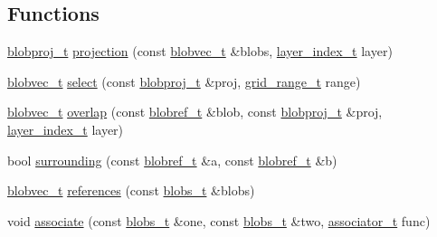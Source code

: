 \subsection*{Functions}
\begin{DoxyCompactItemize}
\item 
\hyperlink{namespace_wire_cell_1_1_ray_grid_a2495e73e12fdf4e81ffef9d99f8a8e22}{blobproj\+\_\+t} \hyperlink{namespace_wire_cell_1_1_ray_grid_ab1dc12b3013c5cc290ca5f8d945d54e5}{projection} (const \hyperlink{namespace_wire_cell_1_1_ray_grid_a3154c64db4d07056418dfcd1afbf0531}{blobvec\+\_\+t} \&blobs, \hyperlink{namespace_wire_cell_1_1_ray_grid_ab7562e54b58eede813d5b70b5eb85812}{layer\+\_\+index\+\_\+t} layer)
\item 
\hyperlink{namespace_wire_cell_1_1_ray_grid_a3154c64db4d07056418dfcd1afbf0531}{blobvec\+\_\+t} \hyperlink{namespace_wire_cell_1_1_ray_grid_ab4d35d6d20bc86bbc5403f8a50824ec6}{select} (const \hyperlink{namespace_wire_cell_1_1_ray_grid_a2495e73e12fdf4e81ffef9d99f8a8e22}{blobproj\+\_\+t} \&proj, \hyperlink{namespace_wire_cell_1_1_ray_grid_a4f0a195ceaa41bf0c9d13f0c81309633}{grid\+\_\+range\+\_\+t} range)
\item 
\hyperlink{namespace_wire_cell_1_1_ray_grid_a3154c64db4d07056418dfcd1afbf0531}{blobvec\+\_\+t} \hyperlink{namespace_wire_cell_1_1_ray_grid_af03e98b7efe2bb929cf7d581897eff83}{overlap} (const \hyperlink{namespace_wire_cell_1_1_ray_grid_abed76699c704f53d6c4ce912da18050b}{blobref\+\_\+t} \&blob, const \hyperlink{namespace_wire_cell_1_1_ray_grid_a2495e73e12fdf4e81ffef9d99f8a8e22}{blobproj\+\_\+t} \&proj, \hyperlink{namespace_wire_cell_1_1_ray_grid_ab7562e54b58eede813d5b70b5eb85812}{layer\+\_\+index\+\_\+t} layer)
\item 
bool \hyperlink{namespace_wire_cell_1_1_ray_grid_a3bad40376b17bd165849797eb16c9ed2}{surrounding} (const \hyperlink{namespace_wire_cell_1_1_ray_grid_abed76699c704f53d6c4ce912da18050b}{blobref\+\_\+t} \&a, const \hyperlink{namespace_wire_cell_1_1_ray_grid_abed76699c704f53d6c4ce912da18050b}{blobref\+\_\+t} \&b)
\item 
\hyperlink{namespace_wire_cell_1_1_ray_grid_a3154c64db4d07056418dfcd1afbf0531}{blobvec\+\_\+t} \hyperlink{namespace_wire_cell_1_1_ray_grid_a1f3f06c1120d6202ac80459d28c4afa4}{references} (const \hyperlink{namespace_wire_cell_1_1_ray_grid_aea2069aff62790df3241ee7446e81ade}{blobs\+\_\+t} \&blobs)
\item 
void \hyperlink{namespace_wire_cell_1_1_ray_grid_adc5b10091f5718c87dd256f3898a2740}{associate} (const \hyperlink{namespace_wire_cell_1_1_ray_grid_aea2069aff62790df3241ee7446e81ade}{blobs\+\_\+t} \&one, const \hyperlink{namespace_wire_cell_1_1_ray_grid_aea2069aff62790df3241ee7446e81ade}{blobs\+\_\+t} \&two, \hyperlink{namespace_wire_cell_1_1_ray_grid_a7441e06379a2aef6996c5fae438b797a}{associator\+\_\+t} func)

\end{DoxyCompactItemize}
